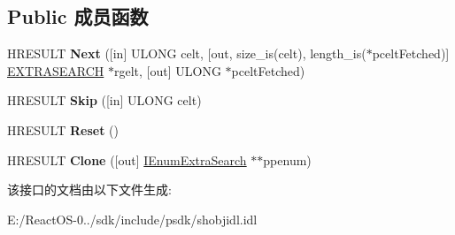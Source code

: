 \subsection*{Public 成员函数}
\begin{DoxyCompactItemize}
\item 
\mbox{\label{interface_i_enum_extra_search_a73c012b0df588ba92c5c63374ebf3671}} 
H\+R\+E\+S\+U\+LT {\bfseries Next} (\mbox{[}in\mbox{]} U\+L\+O\+NG celt, \mbox{[}out, size\+\_\+is(celt), length\+\_\+is($\ast$pcelt\+Fetched)\mbox{]} \hyperlink{struct_i_enum_extra_search_1_1_e_x_t_r_a_s_e_a_r_c_h}{E\+X\+T\+R\+A\+S\+E\+A\+R\+CH} $\ast$rgelt, \mbox{[}out\mbox{]} U\+L\+O\+NG $\ast$pcelt\+Fetched)
\item 
\mbox{\label{interface_i_enum_extra_search_afe3309de05d0864863d1f55b1625a47f}} 
H\+R\+E\+S\+U\+LT {\bfseries Skip} (\mbox{[}in\mbox{]} U\+L\+O\+NG celt)
\item 
\mbox{\label{interface_i_enum_extra_search_a2e63f782195de66f90faaef6757a621d}} 
H\+R\+E\+S\+U\+LT {\bfseries Reset} ()
\item 
\mbox{\label{interface_i_enum_extra_search_ac8c196329e50b9f85f566d9da350c9b7}} 
H\+R\+E\+S\+U\+LT {\bfseries Clone} (\mbox{[}out\mbox{]} \hyperlink{interface_i_enum_extra_search}{I\+Enum\+Extra\+Search} $\ast$$\ast$ppenum)
\end{DoxyCompactItemize}


该接口的文档由以下文件生成\+:\begin{DoxyCompactItemize}
\item 
E\+:/\+React\+O\+S-\/0../sdk/include/psdk/shobjidl.\+idl\end{DoxyCompactItemize}

